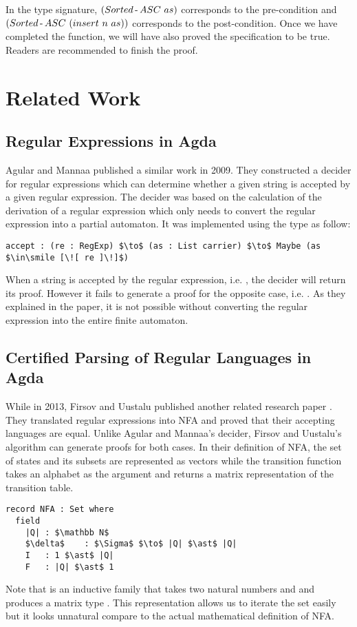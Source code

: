 \par In the type signature, \((Sorted\hyphen ASC\ as)\) corresponds to the pre-condition and
\((Sorted\operatorname{-} ASC\ (insert\ n\ as))\) corresponds to the
post-condition. Once we have completed the
function, we will have also proved the specification to be
true. Readers are recommended to finish the proof. 



\newpage
\section{Related Work}

\subsection{Regular Expressions in Agda}
\par Agular and Mannaa published a
similar work \cite{agular2009} in 2009. They constructed a decider for
regular expressions which can determine whether
a given string is accepted by a given regular expression. The decider was based on the calculation of the derivation of a regular
expression which only needs to convert the regular expression into
a partial automaton. It was implemented using the  type as follow:
\begin{lstlisting}[mathescape=true,xleftmargin=.3\textwidth]
accept : (re : RegExp) $\to$ (as : List carrier) $\to$ Maybe (as $\in\smile [\![ re ]\!]$)
\end{lstlisting}
\par When a string is accepted by the regular expression, i.e. , the decider will return its proof. However it fails to generate a
proof for the opposite case, i.e. . As they
explained in the paper, it is not possible without converting the regular expression into
the entire finite automaton. 


\subsection{Certified Parsing of Regular Languages in Agda}
\par While in 2013, Firsov and Uustalu published another related
research paper \cite{firsov2013}. They translated regular expressions
into NFA and proved that their accepting languages are
equal. Unlike Agular and Mannaa's decider, Firsov and Uustalu's
algorithm can generate proofs for both cases. In their definition of NFA, the set of states
 and its subsets are represented as vectors while the transition function
\mb{\delta} takes an alphabet as the argument and returns a matrix
representation of the transition table. 
\begin{lstlisting}[mathescape=true,xleftmargin=.3\textwidth]
record NFA : Set where
  field
    |Q| : $\mathbb N$
    $\delta$    : $\Sigma$ $\to$ |Q| $\ast$ |Q|
    I   : 1 $\ast$ |Q|
    F   : |Q| $\ast$ 1
\end{lstlisting}

\par Note that \mb{\_\ast\_} is an inductive family that takes two
natural numbers  and  and
produces a matrix type . This representation allows us to
iterate the set easily but it looks unnatural compare to the actual 
mathematical definition of NFA. 